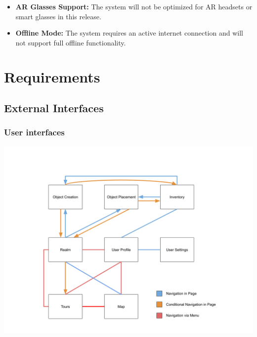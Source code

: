 \documentclass{article}
\begin{document}
\begin{itemize}
    \item \textbf{AR Glasses Support:} The system will not be optimized for AR headsets or smart glasses in this release.
    \item \textbf{Offline Mode:} The system requires an active internet connection and will not support full offline functionality.
\end{itemize}

\section{Requirements}


\subsection{External Interfaces}

\subsubsection{User interfaces}

\begin{center}
    \includegraphics[scale=0.4]{OtherDiagrams/ui_flow.png}
\end{center}
\end{document}
